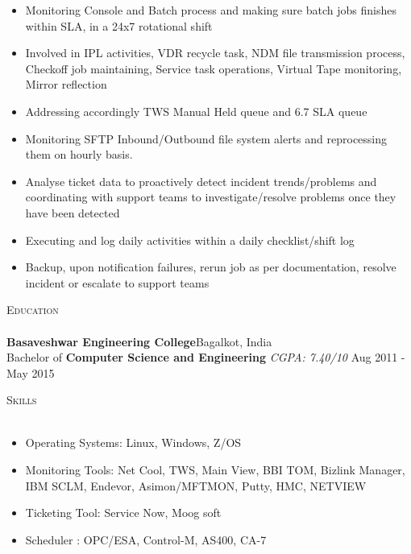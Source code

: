 \documentclass[a4paper]{article}
\newcommand{\lineunder} {
    \vspace*{-8pt} \\
    \hspace*{-18pt} \hrulefill \\
}
\newcommand{\header} [1] {
    {\hspace*{-18pt}\vspace*{6pt} \textsc{#1}}
    \vspace*{-6pt} \lineunder
}
\begin{document}
\justify
\begin{itemize} \itemsep 1pt
          \item Monitoring Console and Batch process and making sure batch jobs finishes within SLA, in a 24x7 rotational shift
	\item Involved in  IPL activities, VDR recycle task, NDM file transmission process, Checkoff job maintaining, Service task operations, Virtual Tape monitoring, Mirror reflection
	\item Addressing accordingly TWS Manual Held queue and 6.7 SLA queue
           \item Monitoring SFTP Inbound/Outbound file system alerts and reprocessing them on hourly basis.
	\item Analyse ticket data to proactively detect incident trends/problems and coordinating with support teams to investigate/resolve problems once they have been detected
	\item Executing and log daily activities within a daily checklist/shift log
           \item Backup, upon notification failures, rerun job as per documentation, resolve incident or escalate to support teams
\end{itemize}

\vspace{2mm}


{\color{blue}\header{Education}}
\vspace{1mm}
\textbf{Basaveshwar Engineering College}\hfill Bagalkot, India\\
Bachelor of \textbf{Computer Science and Engineering} \textit{CGPA: 7.40/10} \hfill Aug 2011 - May 2015\\
\vspace{2mm}


{\color{blue}\header{Skills}}
\vspace{1mm}
\justify
\begin{itemize} \itemsep 1pt
	\item Operating Systems: Linux, Windows, Z/OS \\
	\item Monitoring Tools: Net Cool, TWS, Main View, BBI TOM, Bizlink Manager, IBM SCLM, Endevor, Asimon/MFTMON, Putty, HMC, NETVIEW \\
           \item Ticketing Tool: Service Now, Moog soft \\
           \item Scheduler : OPC/ESA, Control-M, AS400, CA-7
\end{itemize}
\vspace{2mm}
\end{document}
